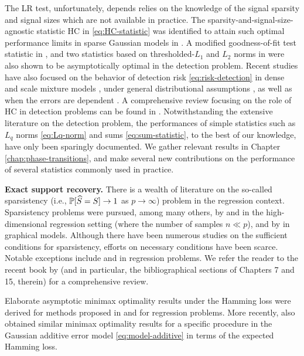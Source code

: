 The \ac{LR} test, unfortunately, depends  relies on the knowledge of the signal sparsity and signal sizes which are 
not available in practice. The sparsity-and-signal-size-agnostic statistic \ac{HC} in \eqref{eq:HC-statistic} was identified 
to attain such optimal performance limits in sparse Gaussian models in \cite{donoho2004higher}. 
A modified goodness-of-fit test statistic in \citet{zhang2002powerful}, and two statistics based on thresholded-$L_1$ and $L_2$ norms in \cite{zhong2013tests} were also shown to be asymptotically optimal in the detection problem.
Recent studies have also focused on the behavior of detection risk \eqref{eq:risk-detection} in dense and scale mixture models \cite{cai2011optimal}, under general distributional assumptions \citep{cai2014optimal, arias2017distribution1}, as well as when the errors are dependent \citep{hall2010innovated}.
A comprehensive review focusing on the role of \ac{HC} in detection problems can be found in \cite{donoho2015special}.
Notwithstanding the extensive literature on the detection problem, the performances of simple statistics such as 
$L_q$ norms \eqref{eq:Lq-norm} and sums \eqref{eq:sum-statistic}, to the best of our knowledge, have only been 
sparingly documented.  We gather relevant results in Chapter \ref{chap:phase-transitions}, and make several new 
contributions on the performance of several statistics commonly used in practice.

\medskip

{\bf Exact support recovery.}
There is a wealth of literature on the so-called sparsistency (i.e., $\P[\widehat{S} = S]\to 1$ as $p\to\infty$) problem in the regression context. 
Sparsistency problems were pursued, among many others, by \citet{zhao2006model} and \citet{wasserman2009high} in the high-dimensional regression setting (where the number of samples $n\ll p$), and by \citet*{meinshausen2006high} in graphical models.
Although there have been numerous studies on the sufficient conditions for sparsistency, efforts on necessary conditions have been scarce.
Notable exceptions include \cite{wainwright2009information, wainwright2009sharp} and \cite{comminges2012tight} in regression problems.
We refer the reader to the recent book by \cite{wainwright2019high} (and in particular, the bibliographical sections of Chapters 7 and 15, therein) for a comprehensive review.

Elaborate asymptotic minimax optimality results under the Hamming loss were derived for methods proposed in \cite{ji2012ups} and \cite{jin2014optimality} for regression problems.
More recently, \cite{butucea2018variable} also obtained similar minimax optimality results for a specific procedure in the Gaussian additive error model \eqref{eq:model-additive} in terms of the expected Hamming loss.

